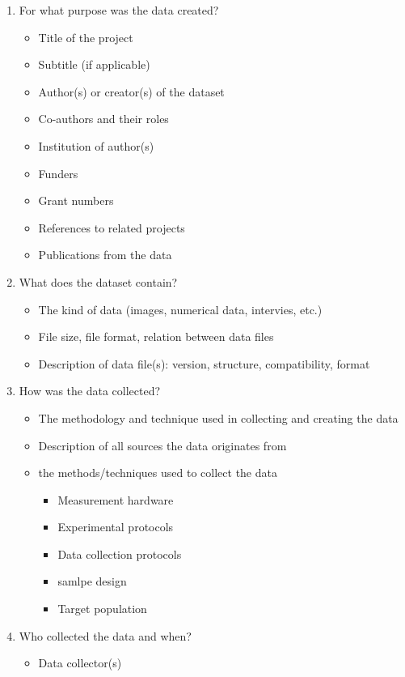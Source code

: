 \begin{enumerate}
	\item For what purpose was the data created?
		\begin{itemize}
		\item Title of the project
		\item Subtitle (if applicable)
		\item Author(s) or creator(s) of the dataset
		\item Co-authors and their roles
		\item Institution of author(s)
		\item Funders
		\item Grant numbers
		\item References to related projects
		\item Publications from the data
		\end{itemize}
	\item What does the dataset contain?
		\begin{itemize}
		\item The kind of data (images, numerical data, intervies, etc.)
		\item File size, file format, relation between data files
		\item Description of data file(s): version, structure, compatibility, format
		\end{itemize}
	\item How was the data collected?
		\begin{itemize}
			\item The methodology and technique used in collecting and creating the data
			\item Description of all sources the data originates from
			\item the methods/techniques used to collect the data
				\begin{itemize}
					\item Measurement hardware
					\item Experimental protocols
					\item Data collection protocols
					\item samlpe design
					\item Target population
				\end{itemize}
			\end{itemize}
		\item Who collected the data and when?
			\begin{itemize}
				\item Data collector(s)

\end{itemize}
\end{enumerate}
